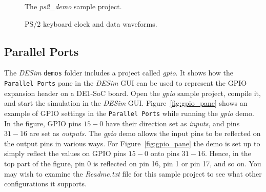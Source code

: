 {\begin{figure}[t]
	\begin{center}
        \setlength{\fboxsep}{0pt}
	\end{center}
          \caption{The {\it ps2\_demo} sample project.}
	\label{fig:ps2}
\end{figure}

\begin{figure}[h]
	\begin{center}
        \setlength{\fboxsep}{0pt}
	\end{center}
          \caption{PS/2 keyboard clock and data waveforms.}
	\label{fig:ps2_clk_dat}
\end{figure}

\subsection{Parallel Ports}

The {\it DESim} \texttt{demos} folder includes a project called {\it gpio}. It shows how 
the \texttt{Parallel Ports} pane in the {\it DESim} GUI can be used to represent the GPIO
expansion header on a DE1-SoC board. Open the {\it gpio} sample project, compile it, and
start the simulation in the {\it DESim} GUI. Figure~\ref{fig:gpio_pane} shows an example
of GPIO settings in the \texttt{Parallel Ports} while running the {\it gpio} demo. In the
figure, GPIO pins $15 - 0$ have their direction set as {\it inputs}, and pins $31 - 16$
are set as {\it outputs}. The {\it gpio} demo allows the input pins to be reflected on the
output pins in various ways. For Figure~\ref{fig:gpio_pane} the demo is set up to simply
reflect the values on GPIO pins $15 - 0$ onto pins $31 - 16$. Hence, in the top part of
the figure, pin 0 is reflected on pin 16, pin 1 or pin 17, and so on. You may wish to
examine the {\it Readme.txt} file for this sample project to see what other configurations
it supports.

}
